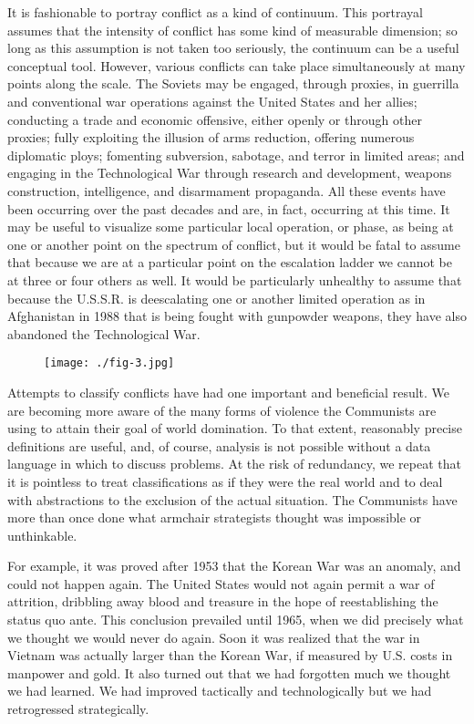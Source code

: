 It is fashionable to portray conflict as a kind of continuum. This portrayal assumes that the intensity of conflict has some kind of measurable dimension; so long as this assumption is not taken too seriously, the continuum can be a useful conceptual tool. However, various conflicts can take place simultaneously at many points along the scale. The Soviets may be engaged, through proxies, in guerrilla and conventional war operations against the United States and her allies; conducting a trade and economic offensive, either openly or through other proxies; fully exploiting the illusion of arms reduction, offering numerous diplomatic ploys; fomenting subversion, sabotage, and terror in limited areas; and engaging in the Technological War through research and development, weapons construction, intelligence, and disarmament propaganda. All these events have been occurring over the past decades and are, in fact, occurring at this time. It may be useful to visualize some particular local operation, or phase, as being at one or another point on the spectrum of conflict, but it would be fatal to assume that because we are at a particular point on the escalation ladder we cannot be at three or four others as well. It would be particularly unhealthy to assume that because the U.S.S.R. is deescalating one or another limited operation as in Afghanistan in 1988 that is being fought with gunpowder weapons, they have also abandoned the Technological War.

\begin{figure}[h!]
    \centering
    \texttt{[image: ./fig-3.jpg]}
\end{figure}

Attempts to classify conflicts have had one important and beneficial result. We are becoming more aware of the many forms of violence the Communists are using to attain their goal of world domination. To that extent, reasonably precise definitions are useful, and, of course, analysis is not possible without a data language in which to discuss problems. At the risk of redundancy, we repeat that it is pointless to treat classifications as if they were the real world and to deal with abstractions to the exclusion of the actual situation. The Communists have more than once done what armchair strategists thought was impossible or unthinkable.

For example, it was proved after 1953 that the Korean War was an anomaly, and could not happen again. The United States would not again permit a war of attrition, dribbling away blood and treasure in the hope of reestablishing the status quo ante. This conclusion prevailed until 1965, when we did precisely what we thought we would never do again. Soon it was realized that the war in Vietnam was actually larger than the Korean War, if measured by U.S. costs in manpower and gold. It also turned out that we had forgotten much we thought we had learned. We had improved tactically and technologically but we had retrogressed strategically.

